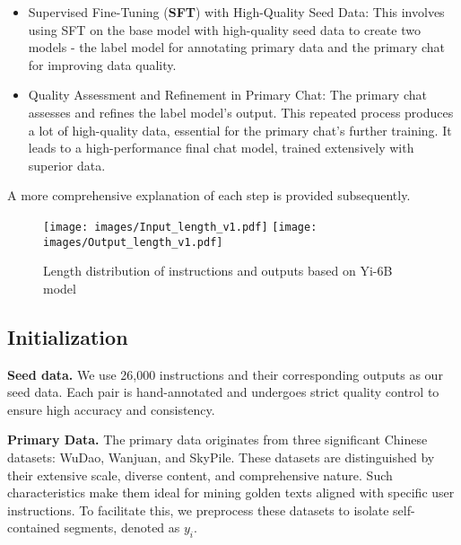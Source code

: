 \begin{itemize}
\item  Supervised Fine-Tuning (\textbf{SFT}) with High-Quality Seed Data: This involves using SFT on the base model with high-quality seed data to create two models - the label model for annotating primary data and the primary chat for improving data quality.
\item  Quality Assessment and Refinement in Primary Chat: The primary chat assesses and refines the label model's output. This repeated process produces a lot of high-quality data, essential for the primary chat's further training. It leads to a high-performance final chat model, trained extensively with superior data.
\end{itemize}
A more comprehensive explanation of each step is provided subsequently.

\begin{figure}[ht]
  \centering
    \centering
    \texttt{[image: images/Input\_length\_v1.pdf]}
  \hfill
    \centering
    \texttt{[image: images/Output\_length\_v1.pdf]}
  \caption{Length distribution of instructions and outputs based on Yi-6B model}
  \label{fig:length}
\end{figure}

\subsection{Initialization}

\textbf{Seed data.} We use 26,000 instructions and their corresponding outputs as our seed data. Each pair is hand-annotated and undergoes strict quality control to ensure high accuracy and consistency.

\noindent
\textbf{Primary Data.} The primary data originates from three significant Chinese datasets: WuDao, Wanjuan, and SkyPile. These datasets are distinguished by their extensive scale, diverse content, and comprehensive nature. Such characteristics make them ideal for mining golden texts aligned with specific user instructions. To facilitate this, we preprocess these datasets to isolate self-contained segments, denoted as ${y}_{i}$.


